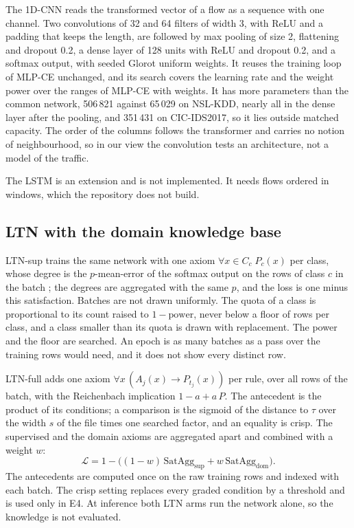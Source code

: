 The 1D-CNN reads the transformed vector of a flow as a sequence with one channel. Two
convolutions of 32 and 64 filters of width 3, with ReLU and a padding that keeps the length, are
followed by max pooling of size 2, flattening and dropout 0.2, a dense layer of 128 units with
ReLU and dropout 0.2, and a softmax output, with seeded Glorot uniform weights. It reuses the
training loop of MLP-CE unchanged, and its search covers the learning rate and the weight power
over the ranges of MLP-CE with weights. It has more parameters than the common network, 506\,821
against 65\,029 on NSL-KDD, nearly all in the dense layer after the pooling, and 351\,431 on
CIC-IDS2017, so it lies outside matched capacity. The order of the columns follows the
transformer and carries no notion of neighbourhood, so in our view the convolution tests an
architecture, not a model of the traffic.

The LSTM is an extension and is not implemented. It needs flows ordered in windows, which the
repository does not build.

\subsection{LTN with the domain knowledge base}
\label{sec:impl-ltn}

LTN-sup trains the same network with one axiom $\forall x\in C_c\; P_c(x)$ per class, whose
degree is the $p$-mean-error of the softmax output on the rows of class $c$ in the batch
\citep{badreddine2022ltn}; the degrees are aggregated with the same $p$, and the loss is one minus
this satisfaction. Batches are not drawn uniformly. The quota of a class is proportional to its
count raised to $1-\mathrm{power}$, never below a floor of rows per class, and a class smaller than its quota is drawn with replacement. The
power and the floor are searched. An epoch is as many batches as a pass over the training
rows would need, and it does not show every distinct row.

LTN-full adds one axiom $\forall x\,(A_j(x)\rightarrow P_{t_j}(x))$ per rule, over all rows
of the batch, with the Reichenbach implication $1-a+a\,P$. The antecedent is the product of its
conditions; a comparison is the sigmoid of the distance to $\tau$ over the width $s$ of the file
times one searched factor, and an equality is crisp. The supervised and the domain axioms are
aggregated apart and combined with a weight $w$:
\begin{equation*}
\mathcal{L} = 1-\bigl((1-w)\,\mathrm{SatAgg}_{\mathrm{sup}}+w\,\mathrm{SatAgg}_{\mathrm{dom}}\bigr).
\end{equation*}
The antecedents are computed once on the raw training rows and indexed with each batch. The
crisp setting replaces every graded condition by a threshold and is used only in E4. At
inference both LTN arms run the network alone, so the knowledge is not evaluated.

